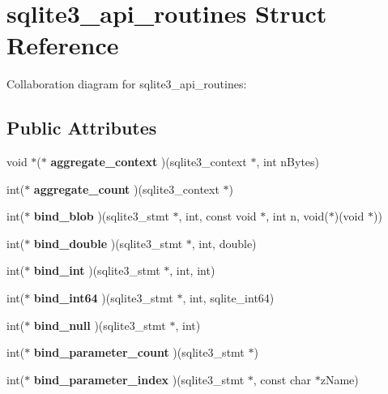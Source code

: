 \section{sqlite3\_\-api\_\-routines Struct Reference}
\label{structsqlite3__api__routines}
Collaboration diagram for sqlite3\_\-api\_\-routines:\subsection*{Public Attributes}
\begin{CompactItemize}
\item 
void $\ast$($\ast$ \textbf{aggregate\_\-context} )(sqlite3\_\-context $\ast$, int nBytes)\label{structsqlite3__api__routines_a3f6a07d8461f938e6d7dfbe182ac934}

\item 
int($\ast$ \textbf{aggregate\_\-count} )(sqlite3\_\-context $\ast$)\label{structsqlite3__api__routines_f49dd1a65986741dbd67915afa2ba18d}

\item 
int($\ast$ \textbf{bind\_\-blob} )(sqlite3\_\-stmt $\ast$, int, const void $\ast$, int n, void($\ast$)(void $\ast$))\label{structsqlite3__api__routines_1f151062d21ab39ae05dd7668797411e}

\item 
int($\ast$ \textbf{bind\_\-double} )(sqlite3\_\-stmt $\ast$, int, double)\label{structsqlite3__api__routines_c26b919f2090d20b5dc32132a1b1e486}

\item 
int($\ast$ \textbf{bind\_\-int} )(sqlite3\_\-stmt $\ast$, int, int)\label{structsqlite3__api__routines_bfbb026281ef9abe27f04e0c31e732f2}

\item 
int($\ast$ \textbf{bind\_\-int64} )(sqlite3\_\-stmt $\ast$, int, sqlite\_\-int64)\label{structsqlite3__api__routines_fbeddc325be8ab3b97c5aee112e531e1}

\item 
int($\ast$ \textbf{bind\_\-null} )(sqlite3\_\-stmt $\ast$, int)\label{structsqlite3__api__routines_336722666f298118a8ec0bad1983aa9b}

\item 
int($\ast$ \textbf{bind\_\-parameter\_\-count} )(sqlite3\_\-stmt $\ast$)\label{structsqlite3__api__routines_1abd04201b7c4c008327028499e45977}

\item 
int($\ast$ \textbf{bind\_\-parameter\_\-index} )(sqlite3\_\-stmt $\ast$, const char $\ast$zName)\label{structsqlite3__api__routines_21e8a0a87660bf39be444cbca873bb5c}


\end{CompactItemize}
